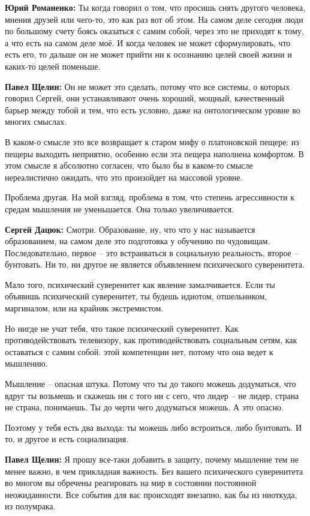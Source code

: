 \textbf{Юрий Романенко:} Ты когда говорил о том, что просишь снять другого человека,
мнения друзей или чего-то, это как раз вот об этом. На самом деле сегодня люди
по большому счету боясь оказаться с самим собой, через это не приходят к тому,
а что есть на самом деле моё. И когда человек не может сформулировать, что есть
его, то дальше он не может прийти ни к осознанию целей своей жизни и каких-то
целей поменьше.

\textbf{Павел Щелин:} Он не может это сделать, потому что все системы, о которых говорил
Сергей, они устанавливают очень хороший, мощный, качественный барьер между
тобой и тем, что есть условно, даже на онтологическом уровне во многих смыслах.

В каком-о смысле это все возвращает к старом мифу о платоновской пещере: из
пещеры выходить неприятно, особенно если эта пещера наполнена комфортом. В этом
смысле я абсолютно согласен, что было бы в каком-то смысле нереалистично
ожидать, что это произойдет на массовой уровне.

Проблема другая. На мой взгляд, проблема в том, что степень агрессивности к
средам мышления не уменьшается. Она только увеличивается.

\textbf{Сергей Дацюк:} Смотри. Образование, ну, что что у нас называется образованием,
на самом деле это подготовка у обучению по чудовищам. Последовательно, первое –
это встраиваться в социальную реальность, второе – бунтовать. Ни то, ни другое
не является объявлением психического суверенитета.

Мало того, психический суверенитет как явление замалчивается. Если ты объявишь
психический суверенитет, ты будешь идиотом, отшельником, маргиналом, или на
крайняк экстремистом.

Но нигде не учат тебя, что такое психический суверенитет. Как
противодействовать телевизору, как противодействовать социальным сетям, как
оставаться с самим собой. этой компетенции нет, потому что она ведет к
мышлению.

Мышление – опасная штука. Потому что ты до такого можешь додуматься, что вдруг
ты возьмешь и скажешь ни с того ни с сего, что лидер – не лидер, страна не
страна, понимаешь. Ты до черти чего додуматься можешь. А это опасно.

Поэтому у тебя есть два выхода: ты можешь либо встроиться, либо бунтовать. И
то, и другое и есть социализация.

\textbf{Павел Щелин:} Я прошу все-таки добавить в защиту, почему мышление тем не менее
важно, в чем прикладная важность. Без вашего психического суверенитета во
многом вы обречены реагировать на мир в состоянии постоянной неожиданности. Все
события для вас происходят внезапно, как бы из ниоткуда, из полумрака.

